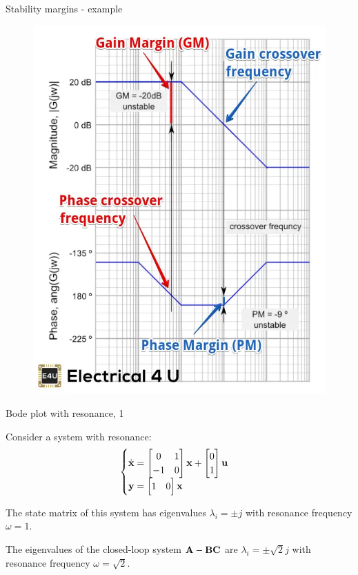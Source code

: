 \documentclass{beamer}
\begin{document}
\begin{frame}{Stability margins - example}

\begin{figure}
	\centering
	\includegraphics[width=0.68\linewidth]{bode-plot}
	\caption{}
	\label{fig:bode-plot}
\end{figure}


\end{frame}





\begin{frame}{Bode plot with resonance, 1}
	\begin{flushleft}
	
Consider a system with resonance:
%
\begin{equation}
	\begin{cases}
		\dot{\mathbf{x}} = 
		\begin{bmatrix}
			0 & 1 \\
			-1 & 0
		\end{bmatrix}
		\mathbf{x}
		+ 
		\begin{bmatrix}
			0\\
			1
		\end{bmatrix}
		\mathbf{u} 
		\\
		\mathbf{y} = 
		\begin{bmatrix}
			1 & 0
		\end{bmatrix}
		\mathbf{x}
	\end{cases}
\end{equation}

The state matrix of this system has eigenvalues $\lambda_i = \pm j$ with resonance frequency $\omega = 1$.

\bigskip

The eigenvalues of the closed-loop system $\mathbf{A} - \mathbf{B} \mathbf{C}$ are $\lambda_i = \pm \sqrt{2} j$ with resonance frequency $\omega = \sqrt{2}$.

\end{flushleft}
\end{frame}
\end{document}
